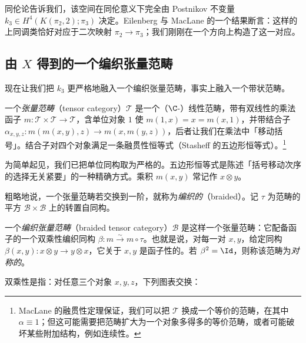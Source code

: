 同伦论告诉我们，该空间在同伦意义下完全由 Postnikov 不变量 $k_3\in H^4(K(\pi_2,2);\pi_3)$ 决定。Eilenberg 与 MacLane 的一个结果断言：这样的上同调类恰好对应于二次映射 $\pi_2\to\pi_3$；我们刚刚在一个方向上构造了这一对应。

\subsection{由 \texorpdfstring{$X$}{X} 得到的一个编织张量范畴}

现在让我们把 $k_3$ 更严格地融入一个编织张量范畴，事实上融入一个带状范畴。

\begin{definition}一个\emph{张量范畴}（tensor category）$\mathcal{T}$ 是一个（$\C$-）线性范畴，带有双线性的乘法函子 $m\colon\mathcal{T}\times\mathcal{T}\to\mathcal{T}$，含单位对象 $1$ 使 $m(1,x)=x=m(x,1)$，并带结合子 $\alpha_{x,y,z}\colon m(m(x,y),z)\to m(x,m(y,z))$，后者让我们在乘法中「移动括号」。结合子对四个对象满足一条融贯性恒等式（Stasheff 的五边形恒等式）。\footnote{MacLane 的融贯性定理保证，我们可以把 $\mathcal{T}$ 换成一个等价的范畴，在其中 $\alpha\equiv1$；但这可能需要把范畴扩大为一个对象多得多的等价范畴，或者可能破坏某些附加结构，例如连续性。}\end{definition}

为简单起见，我们已把单位同构取为严格的。五边形恒等式是陈述「括号移动次序的选择无关紧要」的一种精确方式。乘积 $m(x,y)$ 常记作 $x\otimes y$。

粗略地说，一个张量范畴若交换到一阶，就称为\emph{编织的}（braided）。记 $\tau$ 为范畴的平方 $\mathcal{B}\times\mathcal{B}$ 上的转置自同构。

\begin{definition}一个\emph{编织张量范畴}（braided tensor category）$\mathcal{B}$ 是这样一个张量范畴：它配备函子的一个双乘性编织同构 $\beta\colon m\xrightarrow{\sim}m\circ\tau$。也就是说，对每一对 $x,y$，给定同构 $\beta(x,y)\colon x\otimes y\to y\otimes x$，它关于 $x,y$ 是函子性的。若 $\beta^2=\Id$，则称该范畴为\emph{对称的}。\end{definition}

双乘性是指：对任意三个对象 $x,y,z$，下列图表交换：
\begin{center}
\end{center}
\begin{center}
\end{center}

